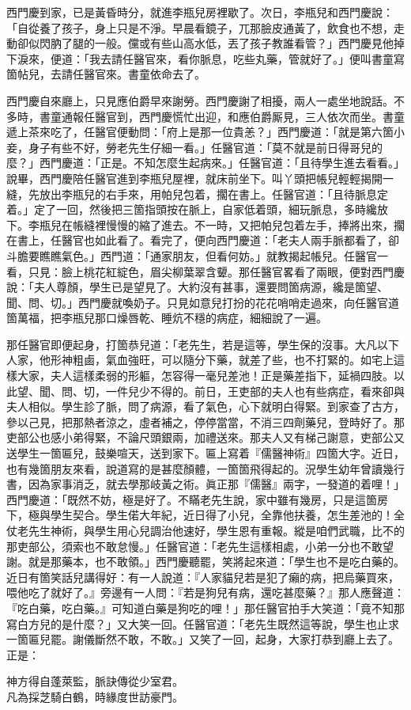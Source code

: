 西門慶到家，已是黃昏時分，就進李瓶兒房裡歇了。次日，李瓶兒和西門慶說：「自從養了孩子，身上只是不淨。早晨看鏡子，兀那臉皮通黃了，飲食也不想，走動卻似閃肭了腿的一般。儻或有些山高水低，丟了孩子教誰看管？」西門慶見他掉下淚來，便道：「我去請任醫官來，看你脈息，吃些丸藥，管就好了。」便叫書童寫箇帖兒，去請任醫官來。書童依命去了。

西門慶自來廳上，只見應伯爵早來謝勞。西門慶謝了相擾，兩人一處坐地說話。不多時，書童通報任醫官到，西門慶慌忙出迎，和應伯爵厮見，三人依次而坐。書童遞上茶來吃了，任醫官便動問：「府上是那一位貴恙？」西門慶道：「就是第六箇小妾，身子有些不好，勞老先生仔細一看。」任醫官道：「莫不就是前日得哥兒的麼？」西門慶道：「正是。不知怎麼生起病來。」任醫官道：「且待學生進去看看。」說畢，西門慶陪任醫官進到李瓶兒屋裡，就床前坐下。叫丫頭把帳兒輕輕揭開一縫，先放出李瓶兒的右手來，用帕兒包着，擱在書上。任醫官道：「且待脈息定着。」定了一回，然後把三箇指頭按在脈上，{}自家低着頭，細玩脈息，{}多時纔放下。李瓶兒在帳縫裡慢慢的縮了進去。不一時，又把帕兒包着左手，捧將出來，擱在書上，任醫官也如此看了。看完了，便向西門慶道：「老夫人兩手脈都看了，卻斗膽要瞧瞧氣色。」西門道：「通家朋友，但看何妨。」就教揭起帳兒。{}任醫官一看，只見：臉上桃花紅綻色，眉尖柳葉翠含顰。那任醫官畧看了兩眼，便對西門慶說：「夫人尊顏，學生已是望見了。大約沒有甚事，還要問箇病源，纔是箇望、聞、問、切。」西門慶就喚奶子。只見如意兒打扮的花花哨哨走過來，向任醫官道箇萬福，把李瓶兒那口燥唇乾、睡炕不穩的病症，細細說了一遍。

那任醫官即便起身，打箇恭兒道：「老先生，若是這等，學生保的沒事。大凡以下人家，他形神粗鹵，氣血強旺，可以隨分下藥，就差了些，也不打緊的。{}如宅上這樣大家，夫人這樣柔弱的形軀，怎容得一毫兒差池！正是藥差指下，延禍四肢。以此望、聞、問、切，一件兒少不得的。前日，王吏部的夫人也有些病症，看來卻與夫人相似。學生診了脈，問了病源，看了氣色，心下就明白得緊。到家查了古方，參以己見，把那熱者涼之，虛者補之，停停當當，不消三四劑藥兒，登時好了。那吏部公也感小弟得緊，不論尺頭銀兩，加禮送來。那夫人又有梯己謝意，吏部公又送學生一箇匾兒，鼓樂喧天，送到家下。匾上寫着『儒醫神術』四箇大字。近日，也有幾箇朋友來看，說道寫的是甚麼顏體，{}一箇箇飛得起的。況學生幼年曾讀幾行書，因為家事消乏，就去學那岐黃之術。眞正那『儒醫』兩字，一發道的着哩！」{}西門慶道：「既然不妨，極是好了。不瞞老先生說，家中雖有幾房，只是這箇房下，極與學生契合。學生偌大年紀，近日得了小兒，全靠他扶養，怎生差池的！全仗老先生神術，與學生用心兒調治他速好，學生恩有重報。縱是咱們武職，比不的那吏部公，{}須索也不敢怠慢。」任醫官道：「老先生這樣相處，小弟一分也不敢望謝。就是那藥本，也不敢領。」西門慶聽罷，笑將起來道：「學生也不是吃白藥的。近日有箇笑話兒講得好：有一人說道：『人家貓兒若是犯了癩的病，把烏藥買來，喂他吃了就好了。』旁邊有一人問：『若是狗兒有病，還吃甚麼藥？』那人應聲道：『吃白藥，吃白藥。』可知道白藥是狗吃的哩！」那任醫官拍手大笑道：「竟不知那寫白方兒的是什麼？」又大笑一回。任醫官道：「老先生既然這等說，學生也止求一箇匾兒罷。謝儀斷然不敢，不敢。」又笑了一回，起身，大家打恭到廳上去了。正是：

\begin{myquote}
神方得自蓬萊監，脈訣傳從少室君。\\凡為採芝騎白鶴，時緣度世訪豪門。
\end{myquote}

